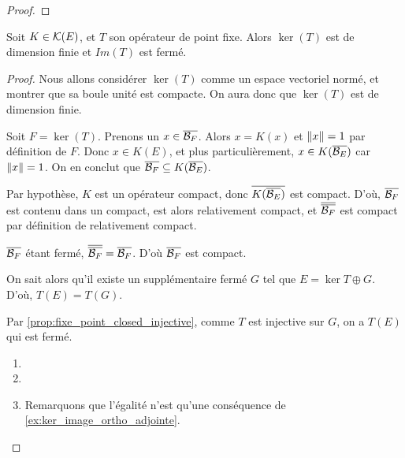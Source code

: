 \begin{proof}
\end{proof}

\begin{proposition}
	Soit $K \in \mathcal{K}(E)$, et $T$ son opérateur de point fixe. Alors
	$\ker(T)$ est de dimension finie et $Im(T)$ est fermé.
\end{proposition}

\begin{proof}
	Nous allons considérer $\ker(T)$ comme un espace vectoriel normé, et montrer
	que sa boule unité est compacte. On aura donc que $\ker(T)$ est de
	dimension finie.

	Soit $F = \ker(T)$.
	Prenons un $x \in \overline{\mathcal{B}_{F}}$. Alors $x = K(x)$ et $\norm{x} = 1$
	par définition de $F$.
	Donc $x \in K(E)$, et plus particulièrement, $x \in
	K(\overline{\mathcal{B}_{E}})$ car $\norm{x} = 1$.
	On en conclut que $\overline{\mathcal{B}_{F}} \subseteq
	K(\overline{\mathcal{B}_{E}})$.

	Par hypothèse, $K$ est un opérateur compact, donc
	$\overline{K(\overline{\mathcal{B}_{E}})}$ est compact. D'où, $\overline{\mathcal{B}_{F}}$
	est contenu dans un compact, est alors relativement compact, et
	$\overline{\overline{\mathcal{B}_{F}}}$ est compact par définition de relativement
	compact.

	$\overline{\mathcal{B}_{F}}$ étant fermé, $\overline{\overline{\mathcal{B}_{F}}} =
	\overline{\mathcal{B}_{F}}$. D'où $\overline{\mathcal{B}_{F}}$ est compact.

	On sait alors qu'il existe un supplémentaire fermé $G$ tel que $E = \ker{T}
	\oplus G$. D'où, $T(E) = T(G)$.

	Par \ref{prop:fixe_point_closed_injective}, comme $T$ est injective sur $G$,
	on a $T(E)$ qui est fermé.
	\begin{enumerate}
		\item

		\item

		\item Remarquons que l'égalité n'est qu'une conséquence de
			\ref{ex:ker_image_ortho_adjointe}.
	\end{enumerate}
\end{proof}



